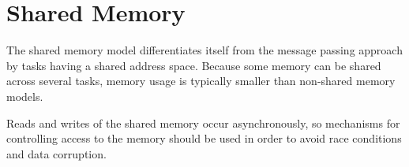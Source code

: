 \section{Shared Memory}

The shared memory model differentiates itself from the message passing approach by tasks having a shared address space. Because some memory can be shared across several tasks, memory usage is typically smaller than non-shared memory models.

Reads and writes of the shared memory occur asynchronously, so mechanisms for controlling access to the memory should be used in order to avoid race conditions and data corruption.
